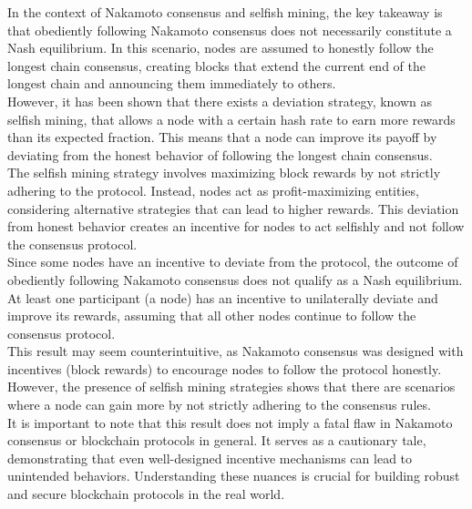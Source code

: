   In the context of Nakamoto consensus and selfish mining, the key takeaway is that obediently following Nakamoto consensus does not necessarily constitute a Nash equilibrium. In this scenario, nodes are assumed to honestly follow the longest chain consensus, creating blocks that extend the current end of the longest chain and announcing them immediately to others.\\
  However, it has been shown that there exists a deviation strategy, known as selfish mining, that allows a node with a certain hash rate to earn more rewards than its expected fraction. This means that a node can improve its payoff by deviating from the honest behavior of following the longest chain consensus.\\
  The selfish mining strategy involves maximizing block rewards by not strictly adhering to the protocol. Instead, nodes act as profit-maximizing entities, considering alternative strategies that can lead to higher rewards. This deviation from honest behavior creates an incentive for nodes to act selfishly and not follow the consensus protocol.\\
  Since some nodes have an incentive to deviate from the protocol, the outcome of obediently following Nakamoto consensus does not qualify as a Nash equilibrium. At least one participant (a node) has an incentive to unilaterally deviate and improve its rewards, assuming that all other nodes continue to follow the consensus protocol.\\
  This result may seem counterintuitive, as Nakamoto consensus was designed with incentives (block rewards) to encourage nodes to follow the protocol honestly. However, the presence of selfish mining strategies shows that there are scenarios where a node can gain more by not strictly adhering to the consensus rules.\\
  
  It is important to note that this result does not imply a fatal flaw in Nakamoto consensus or blockchain protocols in general. It serves as a cautionary tale, demonstrating that even well-designed incentive mechanisms can lead to unintended behaviors. Understanding these nuances is crucial for building robust and secure blockchain protocols in the real world.
  
  
